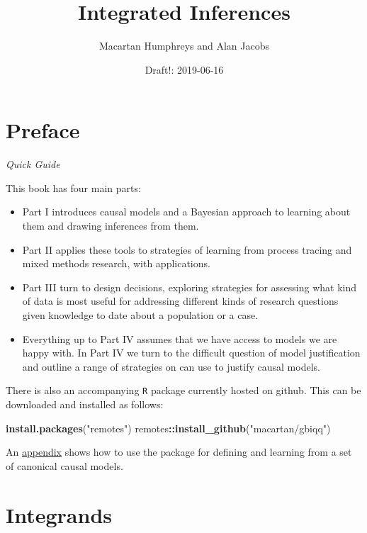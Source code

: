 \documentclass[12pt,]{book}
\title{Integrated Inferences}
\author{Macartan Humphreys and Alan Jacobs}
\date{Draft!: 2019-06-16}
\newenvironment{Shaded}{\begin{snugshade}}{\end{snugshade}}
\newcommand{\KeywordTok}[1]{\textcolor[rgb]{0.13,0.29,0.53}{\textbf{#1}}}
\newcommand{\NormalTok}[1]{#1}
\newcommand{\OperatorTok}[1]{\textcolor[rgb]{0.81,0.36,0.00}{\textbf{#1}}}
\newcommand{\StringTok}[1]{\textcolor[rgb]{0.31,0.60,0.02}{#1}}
\begin{document}
\maketitle

{
\setcounter{tocdepth}{1}
\tableofcontents
}
\hypertarget{preface}{%
\chapter*{Preface}\label{preface}}

\emph{Quick Guide}

This book has four main parts:

\begin{itemize}
\item
  Part I introduces causal models and a Bayesian approach to learning about them and drawing inferences from them.
\item
  Part II applies these tools to strategies of learning from process tracing and mixed methods research, with applications.
\item
  Part III turn to design decisions, exploring strategies for assessing what kind of data is most useful for addressing different kinds of research questions given knowledge to date about a population or a case.
\item
  Everything up to Part IV assumes that we have access to models we are happy with. In Part IV we turn to the difficult question of model justification and outline a range of strategies on can use to justify causal models.
\end{itemize}

There is also an accompanying \texttt{R} package currently hosted on github. This can be downloaded and installed as follows:

\begin{Shaded}
\begin{Highlighting}[]
\KeywordTok{install.packages}\NormalTok{(}\StringTok{"remotes"}\NormalTok{)}
\NormalTok{remotes}\OperatorTok{::}\KeywordTok{install_github}\NormalTok{(}\StringTok{"macartan/gbiqq"}\NormalTok{)}
\end{Highlighting}
\end{Shaded}

An \protect\hyperlink{examplesappendix}{appendix} shows how to use the package for defining and learning from a set of canonical causal models.

\hypertarget{intro}{%
\chapter{Integrands}\label{intro}}
\end{document}
